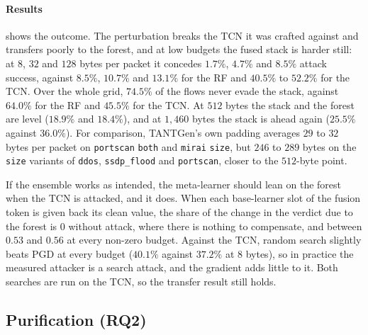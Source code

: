 \documentclass[acmtog,nonacm,pbalance]{acmart}
\newcommand{\src}[1]{\texttt{#1}}
\newcommand{\dmode}[1]{\texttt{#1}}
\begin{document}
\paragraph{Results}  shows the outcome. The perturbation breaks
the TCN it was crafted against and transfers poorly to the forest, and at low
budgets the fused stack is harder still: at $8$, $32$ and $128$ bytes per packet
it concedes $1.7\%$, $4.7\%$ and $8.5\%$ attack success, against $8.5\%$,
$10.7\%$ and $13.1\%$ for the RF and $40.5\%$ to $52.2\%$ for the TCN. Over the
whole grid, $74.5\%$ of the flows never evade the stack, against $64.0\%$ for the
RF and $45.5\%$ for the TCN. At $512$ bytes the stack and the forest are level
($18.9\%$ and $18.4\%$), and at $1{,}460$ bytes the stack is ahead again
($25.5\%$ against $36.0\%$). For comparison, TANTGen's own padding averages $29$
to $32$ bytes per packet on \src{portscan} \dmode{both} and \src{mirai}
\dmode{size}, but $246$ to $289$ bytes on the \dmode{size} variants of
\src{ddos}, \src{ssdp\_flood} and \src{portscan}, closer to the $512$-byte point.

If the ensemble works as intended, the meta-learner should lean on the forest
when the TCN is attacked, and it does. When each base-learner slot of the fusion
token is given back its clean value, the share of the change in the verdict due
to the forest is $0$ without attack, where there is nothing to compensate, and
between $0.53$ and $0.56$ at every non-zero budget. Against the TCN, random
search slightly beats PGD at every budget ($40.1\%$ against $37.2\%$ at $8$
bytes), so in practice the measured attacker is a search attack, and the
gradient adds little to it. Both searches are run on the TCN, so the transfer
result still holds.

\subsection{Purification (RQ2)}\label{sec:eval-purif}
\end{document}
